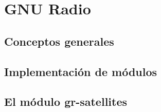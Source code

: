 \chapter{GNU Radio}\label{ch:gnuradio}

\section{Conceptos generales}\label{subc:gr_congen}


\section{Implementación de módulos}

\section{El módulo gr-satellites}
